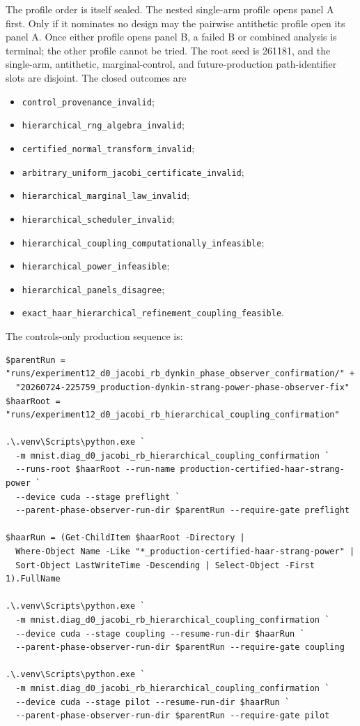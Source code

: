 \documentclass[11pt]{article}
\numberwithin{equation}{section}
\newcommand{\1}{\mathbf 1}
\begin{document}
The profile order is itself sealed.  The nested single-arm profile opens
panel A first.  Only if it nominates no design may the pairwise antithetic
profile open its panel A.  Once either profile opens panel B, a failed B or
combined analysis is terminal; the other profile cannot be tried.  The
root seed is 261181, and the single-arm, antithetic, marginal-control, and
future-production path-identifier slots are disjoint.  The closed outcomes
are
\begin{itemize}[leftmargin=1.5em]
  \item \nolinkurl{control_provenance_invalid};
  \item \nolinkurl{hierarchical_rng_algebra_invalid};
  \item \nolinkurl{certified_normal_transform_invalid};
  \item \nolinkurl{arbitrary_uniform_jacobi_certificate_invalid};
  \item \nolinkurl{hierarchical_marginal_law_invalid};
  \item \nolinkurl{hierarchical_scheduler_invalid};
  \item \nolinkurl{hierarchical_coupling_computationally_infeasible};
  \item \nolinkurl{hierarchical_power_infeasible};
  \item \nolinkurl{hierarchical_panels_disagree};
  \item \nolinkurl{exact_haar_hierarchical_refinement_coupling_feasible}.
\end{itemize}

The controls-only production sequence is:
\begin{Verbatim}[fontsize=\scriptsize,breaklines=true,breakanywhere=true]
$parentRun = "runs/experiment12_d0_jacobi_rb_dynkin_phase_observer_confirmation/" +
  "20260724-225759_production-dynkin-strang-power-phase-observer-fix"
$haarRoot = "runs/experiment12_d0_jacobi_rb_hierarchical_coupling_confirmation"

.\.venv\Scripts\python.exe `
  -m mnist.diag_d0_jacobi_rb_hierarchical_coupling_confirmation `
  --runs-root $haarRoot --run-name production-certified-haar-strang-power `
  --device cuda --stage preflight `
  --parent-phase-observer-run-dir $parentRun --require-gate preflight

$haarRun = (Get-ChildItem $haarRoot -Directory |
  Where-Object Name -Like "*_production-certified-haar-strang-power" |
  Sort-Object LastWriteTime -Descending | Select-Object -First 1).FullName

.\.venv\Scripts\python.exe `
  -m mnist.diag_d0_jacobi_rb_hierarchical_coupling_confirmation `
  --device cuda --stage coupling --resume-run-dir $haarRun `
  --parent-phase-observer-run-dir $parentRun --require-gate coupling

.\.venv\Scripts\python.exe `
  -m mnist.diag_d0_jacobi_rb_hierarchical_coupling_confirmation `
  --device cuda --stage pilot --resume-run-dir $haarRun `
  --parent-phase-observer-run-dir $parentRun --require-gate pilot
\end{Verbatim}
\end{document}

